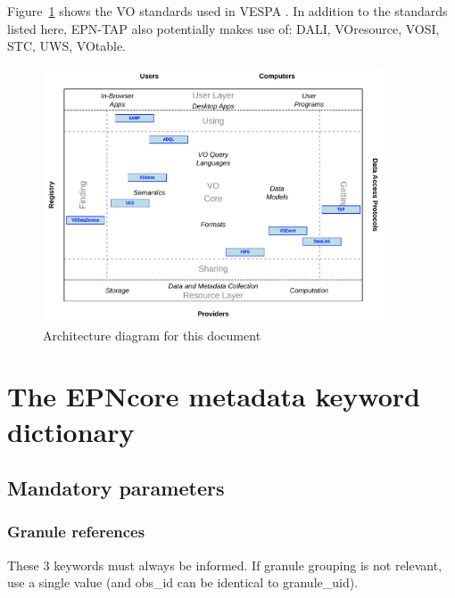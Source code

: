 \documentclass[11pt,a4paper]{ivoa}
\begin{document}
Figure~\ref{fig:archdiag} shows the VO standards used in VESPA \citep{note:VOARCH}.
In addition to the standards listed here, EPN-TAP also potentially makes use of: DALI, VOresource, VOSI, STC, UWS, VOtable. 



\begin{figure}[thb]
\centering

\includegraphics[width=0.9\textwidth]{role_diagram.pdf}
\caption{Architecture diagram for this document}
\label{fig:archdiag}
\end{figure}

\clearpage %

\section{The EPNcore metadata keyword dictionary} 

\subsection{Mandatory parameters}

\subsubsection{Granule references}

These 3 keywords must always be informed. If granule grouping is not relevant, use a single value (and obs\_id can be identical to granule\_uid).
\end{document}
